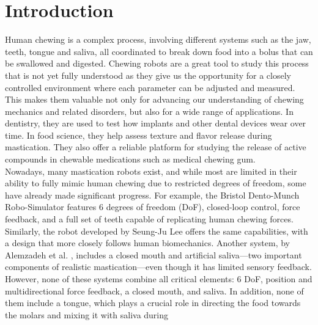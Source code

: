 \section{Introduction}


Human chewing is a complex process, involving different systems such as the jaw, teeth, tongue and saliva, all coordinated to break down food into 
a bolus that can be swallowed and digested. Chewing robots are a great tool to study this process that is not yet fully understood as they give us the opportunity 
for a closely controlled environment where each parameter can be adjusted and measured. This makes them valuable not only for advancing our understanding of 
chewing mechanics and related disorders, but also for a wide range of applications. In dentistry, they are used to test how implants and other dental devices
 wear over time. In food science, they help assess texture and flavor release during mastication. They also offer a reliable platform for studying the release of 
 active compounds in chewable medications such as medical chewing gum.\\
Nowadays, many mastication robots exist, and while most are limited in their ability to fully mimic human chewing due to restricted degrees of freedom, 
some have already made significant progress. For example, the Bristol Dento-Munch Robo-Simulator \cite{BristolChewingRobot} features 6 degrees of freedom 
(DoF), closed-loop control, force feedback, and a full set of teeth capable of replicating human chewing forces. Similarly, the robot developed by Seung-Ju 
Lee \cite{ChewingRobotLinearActuator} offers the same capabilities, with a design that more closely follows human biomechanics. Another system, by Alemzadeh 
et al. \cite{ChewingRobotGums}, includes a closed mouth and artificial saliva—two important components of realistic mastication—even though it has limited 
sensory feedback. However, none of these systems combine all critical elements: 6 DoF, position and multidirectional force feedback, a closed mouth, and 
saliva. In addition, none of them include a tongue, which plays a crucial role in directing the food towards the molars and mixing it with saliva during 
